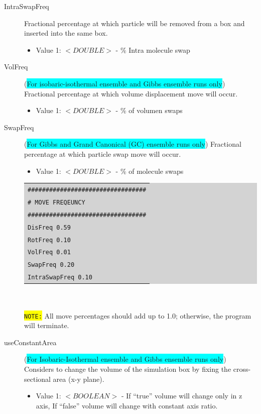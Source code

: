 \begin{description}
\begin{itemize}
	\end{itemize}
\item [IntraSwapFreq] Fractional percentage at which particle will be removed from a box and inserted into the same box.
	\begin{itemize}
	\item Value 1: $<DOUBLE>$ - \% Intra molecule swap
	\end{itemize}
\item [VolFreq] (\colorbox{cyan}{For isobaric-isothermal ensemble and Gibbs ensemble runs only}) Fractional percentage at which volume displacement move will occur.
	\begin{itemize}
	\item Value 1: $<DOUBLE>$ - \% of volumen swaps
	\end{itemize}
\item [SwapFreq] (\colorbox{cyan}{For Gibbs and Grand Canonical (GC) ensemble runs only}) Fractional percentage at which particle swap move will occur.
	\begin{itemize}
	\item Value 1: $<DOUBLE>$ - \% of molecule swaps
	\end{itemize}
	\colorbox{lightgray}{
	\begin{tabular}{l}
	\texttt{\#\#\#\#\#\#\#\#\#\#\#\#\#\#\#\#\#\#\#\#\#\#\#\#\#\#\#\#\#\#\#\#\#}\\
	\texttt{\#  MOVE FREQEUNCY}\\
	\texttt{\#\#\#\#\#\#\#\#\#\#\#\#\#\#\#\#\#\#\#\#\#\#\#\#\#\#\#\#\#\#\#\#\#}\\
	\texttt{DisFreq   0.59}\\
	\texttt{RotFreq   0.10}\\
	\texttt{VolFreq   0.01}\\
	\texttt{SwapFreq   0.20}\\
	\texttt{IntraSwapFreq   0.10}\\
	\end{tabular}}\\\\
	\colorbox{yellow}{\texttt{NOTE:}} All move percentages should add up to 1.0; otherwise, the program will terminate.
\item [useConstantArea] (\colorbox{cyan}{For Isobaric-Isothermal ensemble and Gibbs ensemble runs only}) Considers to change the volume of the simulation box by fixing the cross-sectional area (x-y plane).
	\begin{itemize}
	\item Value 1: $<BOOLEAN>$ - If ``true'' volume will change only in z axis, If ``false'' volume will change with constant axis ratio.

\end{itemize}
\end{description}

